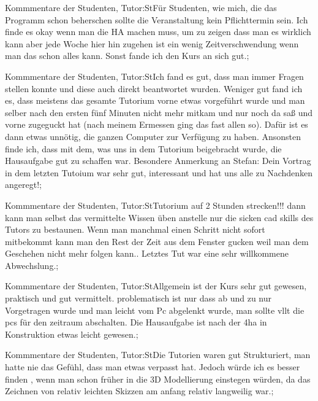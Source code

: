\documentclass[10pt]{beamer}
\begin{document}
\begin{frame}[fragile]{Kommmentare der Studenten, Tutor:St}Für Studenten, wie mich, die das Programm schon beherschen sollte die Veranstaltung kein Pflichttermin sein. Ich finde es okay wenn man die HA machen muss, um zu zeigen dass man es wirklich kann aber jede Woche hier hin zugehen ist ein wenig Zeitverschwendung wenn man das schon alles kann. Sonst fande ich den Kurs an sich gut.;
 \end{frame}
\begin{frame}[fragile]{Kommmentare der Studenten, Tutor:St}Ich fand es gut, dass man immer Fragen stellen konnte und diese auch direkt beantwortet wurden.  Weniger gut fand ich es, dass meistens das gesamte Tutorium vorne etwas vorgeführt wurde und man selber nach den ersten fünf Minuten nicht mehr mitkam und nur noch da saß und vorne zugeguckt hat (nach meinem Ermessen ging das fast allen so). Dafür ist es dann etwas unnötig, die ganzen Computer zur Verfügung zu haben. Ansonsten finde ich, dass mit dem, was uns in dem Tutorium beigebracht wurde, die Hausaufgabe gut zu schaffen war. Besondere Anmerkung an Stefan: Dein Vortrag in dem letzten Tutoium war sehr gut, interessant und hat uns alle zu Nachdenken angeregt!;
 \end{frame}
\begin{frame}[fragile]{Kommmentare der Studenten, Tutor:St}Tutorium auf 2 Stunden strecken!!! dann kann man selbst das vermittelte Wissen üben anstelle nur die sicken cad skills des Tutors zu bestaunen. Wenn man manchmal einen Schritt nicht sofort mitbekommt kann man den Rest der Zeit aus dem Fenster gucken weil man dem Geschehen nicht mehr folgen kann..  Letztes Tut war eine sehr willkommene Abwechslung.;
 \end{frame}
\begin{frame}[fragile]{Kommmentare der Studenten, Tutor:St}Allgemein ist der Kurs sehr gut gewesen, praktisch und gut vermittelt.
 problematisch ist nur dass ab und zu nur Vorgetragen wurde und man leicht vom Pc abgelenkt wurde, man sollte vllt die pcs für den zeitraum abschalten.
 Die Hausaufgabe ist nach der 4ha in Konstruktion etwas leicht gewesen.;
 \end{frame}
\begin{frame}[fragile]{Kommmentare der Studenten, Tutor:St}Die Tutorien waren gut Strukturiert, man hatte nie das Gefühl, dass man etwas verpasst hat. Jedoch würde ich es besser finden , wenn man schon früher in die 3D Modellierung einstegen würden, da das Zeichnen von relativ leichten Skizzen am anfang relativ langweilig war.;
 \end{frame}
\end{document}

